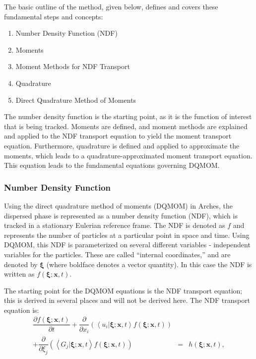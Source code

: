 The basic outline of the method, given below, defines and covers these fundamental steps and concepts:
\begin{enumerate}
\item Number Density Function (NDF)
\item Moments
\item Moment Methods for NDF Transport
\item Quadrature
\item Direct Quadrature Method of Moments
\end{enumerate}

The number density function is the starting point, as it is the function of interest that is being tracked.  Moments are defined, and moment methods are explained and applied to the NDF transport equation to yield the moment transport equation.  Furthermore, quadrature is defined and applied to approximate the moments, which leads to a quadrature-approximated moment transport equation.  This equation leads to the fundamental equations governing DQMOM.

\subsubsection{Number Density Function}\label{subsubsec:NDF}
Using the direct quadrature method of moments (DQMOM) in Arches, the dispersed phase is represented as a number density function (NDF), which is tracked in a stationary Eulerian reference frame. 
The NDF is denoted as $f$ and represents the number of particles at a particular point in space and time.  
Using DQMOM, this NDF is parameterized on several different variables - independent variables for the particles. 
These are called ``internal coordinates,'' and are denoted by $\boldsymbol{\xi}$ (where boldface denotes a vector quantity). 
In this case the NDF is written as $f\left(\boldsymbol{\xi};\boldsymbol{x},t\right)$.

The starting point for the DQMOM equations is the NDF transport equation; this is derived in several places and will not be derived here. The NDF transport equation is:
\begin{eqnarray}\label{eq:NDF transport equation}
  \dfrac{\partial f \left( \boldsymbol{\xi}; \boldsymbol{x},t \right)}{\partial t}  %
  + \dfrac{\partial}{\partial x_{i}} \left( \left< u_{i} \vert \boldsymbol{\xi}; \boldsymbol{x}, t \right> f \left( \boldsymbol{\xi}; \boldsymbol{x},t \right) \right) & & \nonumber \\ %
  + \dfrac{\partial}{\partial \xi_{j}} \left( \left< G_{j} \vert \boldsymbol{\xi};\boldsymbol{x}, t \right> f \left( \boldsymbol{\xi}; \boldsymbol{x},t \right) \right)   %
  & = & h \left( \boldsymbol{\xi}; \boldsymbol{x},t \right),
\end{eqnarray}

